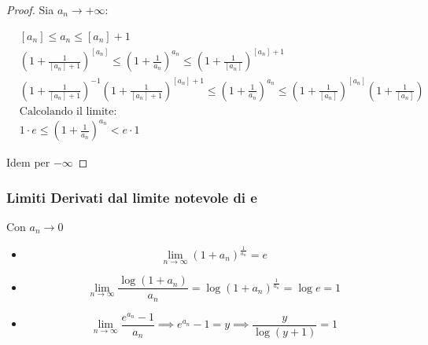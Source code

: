 \begin{proof}
Sia \(a_{n}\to +\infty\): 


\begin{align*}
& [a_{n}]\leq a_{n}\leq[a_{n}]+1 \\
& \left( 1 + \frac{1}{[a_{n}]+1} \right)^{[a_{n}]} \leq \left( 1 + \frac{1}{a_{n}} \right)^{a_{n}} \leq  \left( 1 + \frac{1}{[a_{n}]} \right)^{[a_{n}]+1} \\
& \left( 1 + \frac{1}{[a_{n}]+1} \right)^{-1} \left( 1 + \frac{1}{[a_{n}]+1} \right)^{[a_{n}]+1} \leq \left( 1 + \frac{1}{a_{n}} \right)^{a_{n}} \leq  \left( 1 + \frac{1}{[a_{n}]} \right)^{[a_{n}]}\left( 1 +\frac{1}{[a_{n}]} \right) \\
& \text{Calcolando il limite: } \\
& 1 \cdot e \leq \left( 1 +\frac{1}{a_{n}} \right)^{a_{n}} < e \cdot 1 
\end{align*}


Idem per \(-\infty\)
\end{proof}


\subsubsection{Limiti Derivati dal limite notevole di
e}\label{limiti-derivati-dal-limite-notevole-di-e}

Con \(a_{n}\to 0\) 

\begin{itemize}
    \item \[
    \lim_{ n \to \infty } (1 + a_{n})^{\frac{1}{a_{n}}} = e
    \]
    \item \[
    \lim_{ n \to \infty }\frac{\log (1 + a_{n})}{a_{n}}=\log(1 + a_{n})^{\frac{1}{a_{n}}}=\log e=1
    \]
    \item \[
    \lim_{ n \to \infty } \frac{e^{a_{n}}-1}{a_{n}}\implies e^{a_{n}}-1=y \implies \frac{y}{\log (y+1)}=1
    \]
\end{itemize}


\prop{
\[
\lim_{ n \to \infty } \frac{(1+a_{n})^\alpha -1}{a_{n}}=\alpha \quad \text{(Perchè?)}
\]
}

